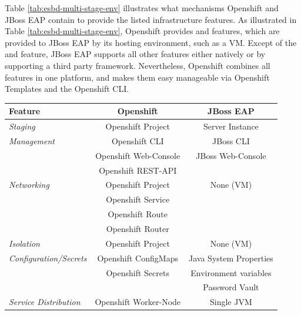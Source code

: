 Table \vref{tab:esbd-multi-stage-env} illustrates what mechanisms Openshift and JBoss EAP contain to provide the listed infrastructure features. As illustrated in Table \vref{tab:esbd-multi-stage-env}, Openshift provides  and  features, which are provided to JBoss EAP by its hosting environment, such as a VM. Except of the  and  feature, JBoss EAP supports all other features either natively or by supporting a third party framework. Nevertheless, Openshift combines all features in one platform, and makes them easy manageable via Openshift Templates and the Openshift CLI.

{\renewcommand{\arraystretch}{1.2}%
\begin{table}[h]
	\begin{tabularx}{\textwidth}{ X|c|c }	
	  \textbf{Feature}              & \textbf{Openshift}      & \textbf{JBoss EAP} \\  \hline
	  \textit{Staging}                  & Openshift Project       & Server Instance \\  \hline
	  \textit{Management}               & Openshift CLI           & JBoss CLI \\
	                                    & Openshift Web-Console   & JBoss Web-Console \\
	                                    & Openshift REST-API      & \\  \hline
	  \textit{Networking}               & Openshift Project       & None (VM) \\
	                                    & Openshift Service       & \\  
	                                    & Openshift Route         & \\  \hline
	                                    & Openshift Router        & \\  \hline
	  \textit{Isolation}                & Openshift Project       & None (VM) \\  \hline
	  \textit{Configuration/Secrets}    & Openshift ConfigMaps    & Java System Properties  \\
	                                    & Openshift Secrets       & Environment variables \\
	                                                             && Password Vault \\  \hline
	  \textit{Service Distribution}     & Openshift Worker-Node   & Single JVM \\ 

\end{tabularx}
\end{table}}
